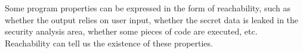 \begin{abstractpage}
 
Some program properties can be expressed in the form of reachability,
such as
whether the output relies on user input, whether the secret data is leaked in the security analysis area, 
whether some pieces of code are executed, etc.
Reachability can tell us the existence of these properties.

\end{abstractpage}
